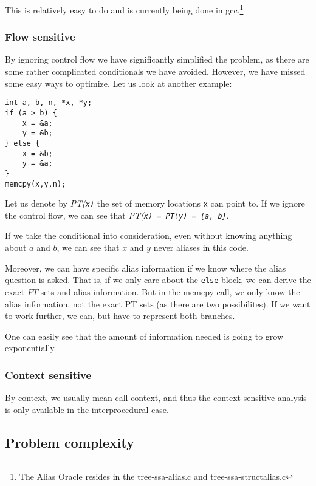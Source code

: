 This is relatively easy to do and is currently being done in gcc.\footnote{The
Alias Oracle resides in the tree-ssa-alias.c and tree-ssa-structalias.c}

\subsubsection{Flow sensitive}

By ignoring control flow we have significantly simplified the problem, as
there are some rather complicated conditionals we have avoided. However, we have
missed some easy ways to optimize. Let us look at another example:

\begin{verbatim}
int a, b, n, *x, *y;
if (a > b) {
    x = &a;
    y = &b;
} else {
    x = &b;
    y = &a;
}
memcpy(x,y,n);
\end{verbatim}

Let us denote by {\it PT(\tt x\it)} the set of memory locations {\tt x} can
point to. If we ignore the control flow, we can see that {\it PT(\tt x\it) = PT(\tt y\it)
= \{\tt a\it, \tt b\it\}}. 

If we take the conditional into consideration, even without knowing anything about
$a$ and $b$, we can see that $x$ and $y$ never aliases in this code.

Moreover, we can have specific alias information if we know where the alias
question is asked. That is, if we only care about the {\tt else} block, we can
derive the exact $PT$ sets and alias information. But in the memcpy call, we
only know the alias information, not the exact PT sets (as there are two
possibilites). If we want to work further, we can, but have to represent both
branches.

One can easily see that the amount of information needed is going to grow
exponentially.

\subsubsection{Context sensitive}

By context, we usually mean call context, and thus the context sensitive
analysis is only available in the interprocedural case.



\subsection{Problem complexity}

